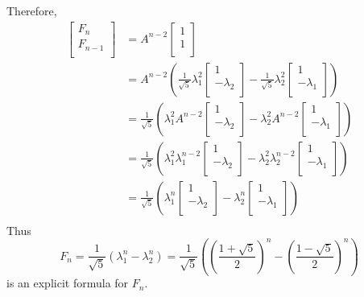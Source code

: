 \documentclass{article}
\begin{document}
\begin{example}
      Therefore,
      \begin{align*}
        \begin{bmatrix}
          F_n\\F_{n-1}\\
        \end{bmatrix} &= A^{n-2}
        \begin{bmatrix}
          1\\1\\
        \end{bmatrix}\\
        &= A^{n-2}\left(\frac{1}{\sqrt{5}} \lambda_1^2
          \begin{bmatrix}
            1\\-\lambda_2\\
          \end{bmatrix} - \frac{1}{\sqrt{5}}\lambda_2^2
          \begin{bmatrix}
            1\\
            -\lambda_1\\
        \end{bmatrix}\right)\\
        &= \frac{1}{\sqrt{5}}\left(\lambda_1^2A^{n-2}
          \begin{bmatrix}
            1\\-\lambda_2\\
          \end{bmatrix} -\lambda_2^2A^{n-2}
          \begin{bmatrix}
            1\\-\lambda_1\\
        \end{bmatrix}\right)\\
        &= \frac{1}{\sqrt{5}}\left(\lambda_1^2\lambda_1^{n-2}
          \begin{bmatrix}
            1\\-\lambda_2\\
          \end{bmatrix} -\lambda_2^2\lambda_2^{n-2}
          \begin{bmatrix}
            1\\-\lambda_1\\
        \end{bmatrix}\right)\\
        &= \frac{1}{\sqrt{5}}\left(\lambda_1^{n}
          \begin{bmatrix}
            1\\-\lambda_2\\
          \end{bmatrix} -\lambda_2^n
          \begin{bmatrix}
            1\\-\lambda_1\\
        \end{bmatrix}\right)\\
      \end{align*}
      Thus \[
        F_n = \frac{1}{\sqrt{5}} (\lambda_1^n - \lambda_2^n) = \frac{1}{\sqrt{5}}\left(\left(\frac{1 + \sqrt{5}}{2}\right)^n - \left(\frac{1-\sqrt{5}}{2}\right)^n\right)
      \] is an explicit formula for $F_n$.
    \end{example}
\end{document}
